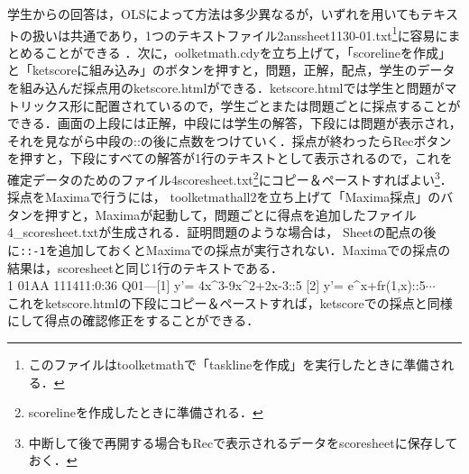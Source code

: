 \documentclass[a4j,12pt]{ujarticle}
\begin{document}
学生からの回答は，OLSによって方法は多少異なるが，いずれを用いてもテキストの扱いは共通であり，1つのテキストファイル2anssheet1130-01.txt\footnote{このファイルはtoolketmathで「tasklineを作成」を実行したときに準備される．}に容易にまとめることができる ．次に，oolketmath.cdyを立ち上げて，「scorelineを作成」と「ketscoreに組み込み」のボタンを押すと，問題，正解，配点，学生のデータを組み込んだ採点用のketscore.htmlができる．ketscore.htmlでは学生と問題がマトリックス形に配置されているので，学生ごとまたは問題ごとに採点することができる．画面の上段には正解，中段には学生の解答，下段には問題が表示され，それを見ながら中段の::の後に点数をつけていく．採点が終わったらRecボタンを押すと，下段にすべての解答が1行のテキストとして表示されるので，これを確定データのためのファイル4scoresheet.txt\footnote{scorelineを作成したときに準備される．}にコピー＆ペーストすればよい\footnote{中断して後で再開する場合もRecで表示されるデータをscoresheetに保存しておく．}．採点をMaximaで行うには，
toolketmathall2を立ち上げて「Maxima採点」のバタンを押すと，Maximaが起動して，問題ごとに得点を追加したファイル
4\_scoresheet.txtが生成される．証明問題のような場合は，
Sheetの配点の後に\verb|::-1|を追加しておくとMaximaでの採点が実行されない．Maximaでの採点の結果は，scoresheetと同じ1行のテキストである．\\
\hspace*{2zw}%
1 01AA 111411:0:36 Q01---[1] y'=  4x\^{}3-9x\^{}2+2x-3::5 [2] y'=  e\^{}x+fr(1,x)::5$\cdots$\\
これをketscore.htmlの下段にコピー＆ペーストすれば，ketscoreでの採点と同様にして得点の確認修正をすることができる．
\end{document}
